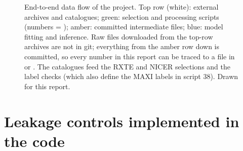 \begin{figure}[p]
\caption[End-to-end data flow]{End-to-end data flow of the project. Top row (white): external archives and catalogues;
green: selection and processing scripts (numbers = ); amber: committed intermediate files; blue: model fitting
and inference. Raw files downloaded from the top-row archives are not in git; everything from the amber row down is committed, so
every number in this report can be traced to a file in  or . The catalogues feed the RXTE and
NICER selections and the label checks (which also define the MAXI labels in script 38). Drawn for this report.}
\label{fig:dataflow}
\end{figure}

\section{Leakage controls implemented in the code}\label{sec:leakagecontrols}

